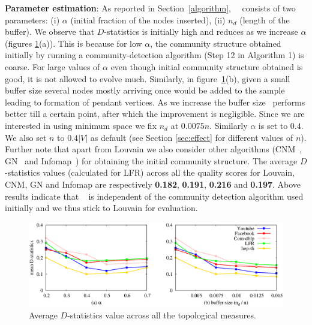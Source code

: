 {\bf Parameter estimation}:
As reported in Section~\ref{algorithm},~\compas~ consists of two parameters: (i) $\alpha$ (initial fraction of the nodes inserted), (ii) $n_d$ (length of the buffer).
We observe that $D$-statistics is initially high and reduces as we increase $\alpha$ (figures \ref{param_est}(a)). This is because for low $\alpha$, the community structure obtained initially by running a community-detection algorithm (Step 12 in Algorithm 1) is coarse. For large values of $\alpha$ even though initial community structure obtained is good, it is not allowed to evolve much. Similarly, in figure~\ref{param_est}(b), given a small buffer size several nodes mostly arriving once would be added to the sample leading to formation of pendant vertices. As we increase the buffer size \compas~performs better till a certain point, after which the improvement is negligible. Since we are interested in using minimum space we fix $n_d$ at $0.0075 n$. Similarly $\alpha$ is set to $0.4$. 
We also set $n$ to $0.4|V|$ as default (see Section \ref{sec:effect} for different values of $n$). Further note that apart from Louvain we also consider other algorithms (CNM~\cite{clauset2004finding}, GN~\cite{girvan2002community} and Infomap~\cite{rosvall2008maps}) for obtaining the initial community structure. 
The average $D$-statistics values (calculated for LFR) across all the quality scores for Louvain, CNM, GN and Infomap are respectively \textbf{0.182}, \textbf{0.191}, \textbf{0.216} and \textbf{0.197}. 
Above results indicate that \compas~ is independent of the community detection algorithm used initially and we thus stick to Louvain for evaluation.

\begin{figure}[!h]
\centering
\includegraphics[width=0.8\columnwidth]{./texfiles/Chapter_2/figures/param_estimate.eps}
\caption{\label{param_est}Average $D$-statistics value across all the topological measures.}
\vspace{3mm}
\end{figure}


